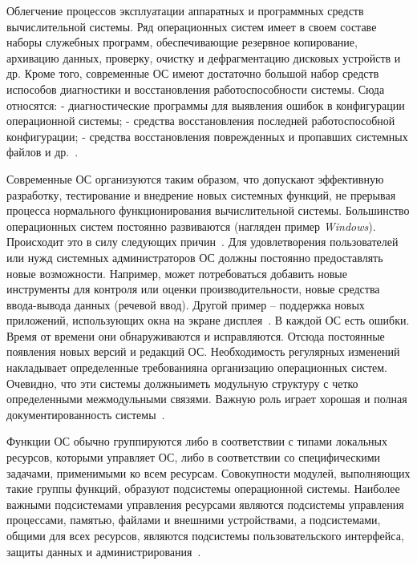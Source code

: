 Облегчение процессов эксплуатации аппаратных и программных средств вычислительной системы. Ряд операционных систем имеет в своем составе наборы   служебных   программ,   обеспечивающие   резервное   копирование, архивацию данных, проверку, очистку и дефрагментацию дисковых устройств и др. Кроме того, современные ОС имеют достаточно большой набор средств испособов диагностики и восстановления работоспособности системы. Сюда относятся: - диагностические программы для выявления ошибок в конфигурации операционной системы; - средства восстановления последней работоспособной конфигурации; - средства   восстановления   поврежденных   и   пропавших   системных файлов и др.~\cite{Oc1}.

Современные   ОС   организуются   таким   образом,   что   допускают эффективную   разработку,   тестирование   и   внедрение   новых   системных функций,   не   прерывая   процесса   нормального   функционирования вычислительной   системы.   Большинство   операционных   систем   постоянно развиваются (нагляден пример \textit{Windows}). Происходит это в силу следующих причин~\cite{Oc1}. Для удовлетворения пользователей или нужд системных администраторов ОС должны постоянно предоставлять новые возможности. Например, может потребоваться   добавить   новые   инструменты   для   контроля   или   оценки производительности,   новые   средства   ввода-вывода   данных   (речевой   ввод). Другой пример – поддержка новых приложений, использующих окна на экране дисплея~\cite{Oc1}. В каждой ОС есть ошибки. Время от времени они обнаруживаются и исправляются. Отсюда постоянные появления новых версий и редакций ОС. Необходимость регулярных изменений накладывает определенные требованияна организацию операционных систем. Очевидно, что эти системы должныиметь модульную структуру с четко определенными межмодульными связями. Важную роль играет хорошая и полная документированность системы~\cite{Oc1}.

Функции   ОС   обычно   группируются   либо   в   соответствии   с   типами локальных   ресурсов,   которыми   управляет   ОС,   либо   в   соответствии   со специфическими задачами, применимыми ко всем ресурсам. Совокупности модулей,   выполняющих   такие   группы   функций,   образуют   подсистемы операционной   системы.   Наиболее   важными   подсистемами   управления ресурсами являются подсистемы управления процессами, памятью, файлами и внешними устройствами, а подсистемами, общими для всех ресурсов, являются подсистемы   пользовательского   интерфейса,   защиты   данных   и администрирования~\cite{Oc2}.

